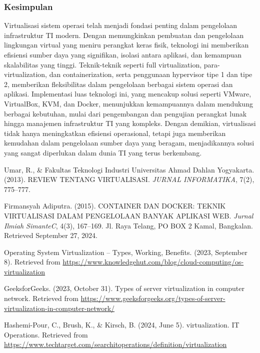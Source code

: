 \documentclass[12pt]{article}
\begin{document}
\subsubsection{Kesimpulan}
    \par Virtualisasi sistem operasi telah menjadi fondasi penting dalam pengelolaan infrastruktur TI modern. Dengan memungkinkan pembuatan dan pengelolaan lingkungan virtual yang meniru perangkat keras fisik, teknologi ini memberikan efisiensi sumber daya yang signifikan, isolasi antara aplikasi, dan kemampuan skalabilitas yang tinggi. Teknik-teknik seperti full virtualization, para-virtualization, dan containerization, serta penggunaan hypervisor tipe 1 dan tipe 2, memberikan fleksibilitas dalam pengelolaan berbagai sistem operasi dan aplikasi. Implementasi luas teknologi ini, yang mencakup solusi seperti VMware, VirtualBox, KVM, dan Docker, menunjukkan kemampuannya dalam mendukung berbagai kebutuhan, mulai dari pengembangan dan pengujian perangkat lunak hingga manajemen infrastruktur TI yang kompleks. Dengan demikian, virtualisasi tidak hanya meningkatkan efisiensi operasional, tetapi juga memberikan kemudahan dalam pengelolaan sumber daya yang beragam, menjadikannya solusi yang sangat diperlukan dalam dunia TI yang terus berkembang.

    \begin{thebibliography}{9}
        Umar, R., \& Fakultas Teknologi Industri Universitas Ahmad Dahlan Yogyakarta. (2013). REVIEW TENTANG VIRTUALISASI. \textit{JURNAL INFORMATIKA}, 7(2), 775–777. 
        
        Firmansyah Adiputra. (2015). CONTAINER DAN DOCKER: TEKNIK VIRTUALISASI DALAM PENGELOLAAN BANYAK APLIKASI WEB. \textit{Jurnal Ilmiah SimanteC}, 4(3), 167–169. Jl. Raya Telang, PO BOX 2 Kamal, Bangkalan. Retrieved September 27, 2024.
        
        Operating System Virtualization – Types, Working, Benefits. (2023, September 8). Retrieved from \url{https://www.knowledgehut.com/blog/cloud-computing/os-virtualization}
        
        GeeksforGeeks. (2023, October 31). Types of server virtualization in computer network. Retrieved from \url{https://www.geeksforgeeks.org/types-of-server-virtualization-in-computer-network/}
        
        Hashemi-Pour, C., Brush, K., \& Kirsch, B. (2024, June 5). virtualization. IT Operations. Retrieved from \url{https://www.techtarget.com/searchitoperations/definition/virtualization}
    \end{thebibliography}
\end{document}
